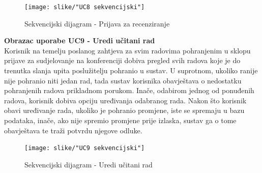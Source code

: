 				\begin{figure}[H]
					\texttt{[image: slike/"UC8 sekvencijski"]} %
					\centering
					\caption{Sekvencijski dijagram - Prijava za recenziranje}
					\label{UC8 sekvencijski} %
				\end{figure}
			
				\text\newline\newline\newline\newline\newline\newline\newline\newline\newline\newline\newline\newline\newline\newline
			
				\noindent\textbf{Obrazac uporabe UC9 - Uredi učitani rad}\\
				
				\noindent Korisnik na temelju poslanog zahtjeva za svim radovima pohranjenim u sklopu prijave za sudjelovanje na konferenciji dobiva pregled svih radova koje je do trenutka slanja upita poslužitelju pohranio u sustav. U suprotnom, ukoliko ranije nije pohranio niti jedan rad, tada sustav korisnika obavještava o nedostatku pohranjenih radova prikladnom porukom. Inače, odabirom jednog od ponuđenih radova, korisnik dobiva opciju uređivanja odabranog rada. Nakon što korisnik obavi uređivanje rada, ukoliko je pohranio promjene, iste se spremaju u bazu podataka, inače, ako nije spremio promjene prije izlaska, sustav ga o tome obavještava te traži potvrdu njegove odluke.
				
				\begin{figure}[H]
					\texttt{[image: slike/"UC9 sekvencijski"]} %
					\centering
					\caption{Sekvencijski dijagram - Uredi učitani rad}
					\label{UC9 sekvencijski} %
				\end{figure}
				
				\text\newline\newline\newline\newline\newline\newline\newline\newline
	
